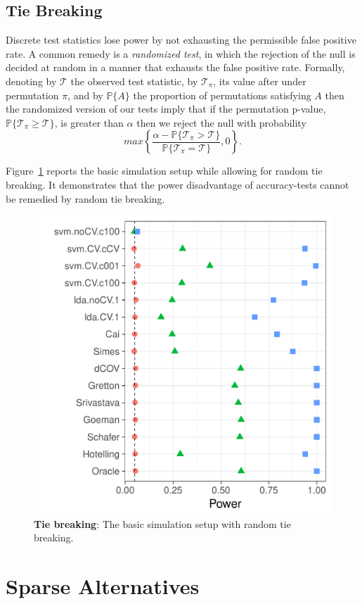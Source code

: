 \documentclass[]{bio}
\begin{document}
\subsection{Tie Breaking}
\label{sec:ties}

Discrete test statistics lose power by not exhausting the permissible false positive rate. 
A common remedy is a \emph{randomized test}, in which the rejection of the null is decided at random in a manner that exhausts the false positive rate. 
Formally, denoting by $\mathcal{T}$ the observed test statistic, by $\mathcal{T}_\pi$, its value after under permutation $\pi$, and by $\mathbb{P}\{A\}$ the proportion of permutations satisfying $A$ then the randomized version of our tests imply that if the permutation p-value, 
$\mathbb{P}\{\mathcal{T}_\pi \geq \mathcal{T}\}$, 
is greater than  $\alpha$ then we reject the null with probability 
$$ max\left\{\frac{\alpha - \mathbb{P}\{\mathcal{T}_\pi > \mathcal{T}\}}{\mathbb{P}\{\mathcal{T}_\pi = \mathcal{T}\}},0 \right\}.$$

Figure~\ref{fig:file33} reports the basic simulation setup while allowing for random tie breaking. 
It demonstrates that the power disadvantage of accuracy-tests cannot be remedied by random tie breaking.

\begin{figure}[ht]
	\centering
	\includegraphics[width=0.5\columnwidth]{art/file33}
	\caption{\textbf{Tie breaking}: The basic simulation setup with random tie breaking.}
	\label{fig:file33}
\end{figure}





\section{Sparse Alternatives}
\label{sec:sparse}
\end{document}
